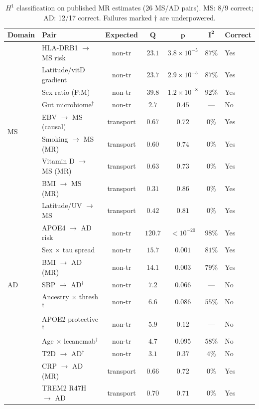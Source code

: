 \documentclass[11pt]{article}
\begin{document}
\begin{table}[t]
\centering
\caption{$H^1$ classification on published MR estimates (26 MS/AD pairs). MS: 8/9 correct; AD: 12/17 correct. Failures marked $\dagger$ are underpowered.}
\label{tab:realdata-h1}
\small
\begin{tabular}{@{}llccccl@{}}
\toprule
\textbf{Domain} & \textbf{Pair} & \textbf{Expected} & $\boldsymbol{Q}$ & $\boldsymbol{p}$ & $\boldsymbol{I^2}$ & \textbf{Correct} \\
\midrule
\multirow{9}{*}{MS}
& HLA-DRB1 $\to$ MS risk & non-tr & $23.1$ & $3.8 \times 10^{-5}$ & $87\%$ & Yes \\
& Latitude/vitD gradient & non-tr & $23.7$ & $2.9 \times 10^{-5}$ & $87\%$ & Yes \\
& Sex ratio (F:M) & non-tr & $39.8$ & $1.2 \times 10^{-8}$ & $92\%$ & Yes \\
& Gut microbiome$^\dagger$ & non-tr & $2.7$ & $0.45$ & --- & No \\
& EBV $\to$ MS (causal) & transport & $0.67$ & $0.72$ & $0\%$ & Yes \\
& Smoking $\to$ MS (MR) & transport & $0.60$ & $0.74$ & $0\%$ & Yes \\
& Vitamin D $\to$ MS (MR) & transport & $0.63$ & $0.73$ & $0\%$ & Yes \\
& BMI $\to$ MS (MR) & transport & $0.31$ & $0.86$ & $0\%$ & Yes \\
& Latitude/UV $\to$ MS & transport & $0.42$ & $0.81$ & $0\%$ & Yes \\
\midrule
\multirow{7}{*}{AD}
& APOE4 $\to$ AD risk & non-tr & $120.7$ & $< 10^{-20}$ & $98\%$ & Yes \\
& Sex $\times$ tau spread & non-tr & $15.7$ & $0.001$ & $81\%$ & Yes \\
& BMI $\to$ AD (MR) & non-tr & $14.1$ & $0.003$ & $79\%$ & Yes \\
& SBP $\to$ AD$^\dagger$ & non-tr & $7.2$ & $0.066$ & --- & No \\
& Ancestry $\times$ thresh$^\dagger$ & non-tr & $6.6$ & $0.086$ & $55\%$ & No \\
& APOE2 protective$^\dagger$ & non-tr & $5.9$ & $0.12$ & --- & No \\
& Age $\times$ lecanemab$^\dagger$ & non-tr & $4.7$ & $0.095$ & $58\%$ & No \\
& T2D $\to$ AD$^\dagger$ & non-tr & $3.1$ & $0.37$ & $4\%$ & No \\
& CRP $\to$ AD (MR) & transport & $0.66$ & $0.72$ & $0\%$ & Yes \\
& TREM2 R47H $\to$ AD & transport & $0.70$ & $0.71$ & $0\%$ & Yes \\

\end{tabular}
\end{table}
\end{document}
